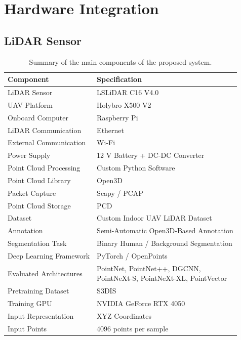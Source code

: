 \section{Hardware Integration}
\label{sec:hardware_integration}

\subsection{LiDAR Sensor}
\label{subsec:lidar_sensor}

\begin{table}[H]
\centering
\caption{Summary of the main components of the proposed system.}
\label{tab:system_summary}
\begin{tabular}{|l|l|}
\hline
\textbf{Component} & \textbf{Specification} \\
\hline
LiDAR Sensor & LSLiDAR C16 V4.0 \\
UAV Platform & Holybro X500 V2 \\
Onboard Computer & Raspberry Pi \\
LiDAR Communication & Ethernet \\
External Communication & Wi-Fi \\
Power Supply & 12 V Battery + DC-DC Converter \\
Point Cloud Processing & Custom Python Software \\
Point Cloud Library & Open3D \\
Packet Capture & Scapy / PCAP \\
Point Cloud Storage & PCD \\
Dataset & Custom Indoor UAV LiDAR Dataset \\
Annotation & Semi-Automatic Open3D-Based Annotation \\
Segmentation Task & Binary Human / Background Segmentation \\
Deep Learning Framework & PyTorch / OpenPoints \\
Evaluated Architectures &
\makecell[l]{PointNet, PointNet++, DGCNN,\\
PointNeXt-S, PointNeXt-XL, PointVector} \\
Pretraining Dataset & S3DIS \\
Training GPU & NVIDIA GeForce RTX 4050 \\
Input Representation & XYZ Coordinates \\
Input Points & 4096 points per sample \\
\hline
\end{tabular}
\end{table}



